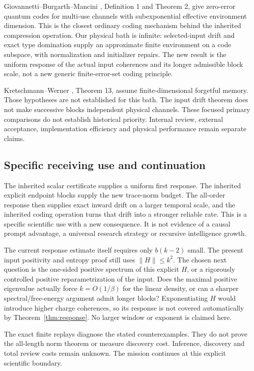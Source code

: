 \documentclass[11pt]{article}
\newcommand{\norm}[1]{\lVert #1\rVert}
\begin{document}
Giovannetti--Burgarth--Mancini \cite{GBM}, Definition 1 and Theorem 2,
give zero-error quantum codes for multi-use channels with subexponential
effective environment dimension. This is the closest ordinary coding
mechanism behind the inherited compression operation. Our physical bath
is infinite: selected-input drift and exact type domination supply an
approximate finite environment on a code subspace, with normalization
and initializer repairs. The new result is the uniform response of the
actual input coherences and its longer admissible block scale, not a
new generic finite-error-set coding principle.

Kretschmann--Werner \cite{KW}, Theorem 13, assume finite-dimensional
forgetful memory. Those hypotheses are not established for this bath.
The input drift theorem does not make successive blocks independent
physical channels. These focused primary comparisons do not establish
historical priority. Internal review, external acceptance, implementation
efficiency and physical performance remain separate claims.

\subsection{Specific receiving use and continuation}

The inherited scalar certificate supplies a uniform first response.
The inherited explicit endpoint blocks supply the new trace-norm budget.
The all-order response then supplies exact inward drift on a larger
temporal scale, and the inherited coding operation turns that drift into
a stronger reliable rate. This is a specific scientific use with a new
consequence. It is not evidence of a causal prompt advantage, a universal
research strategy or recursive intelligence growth.

The current response estimate itself requires only \(b(k-2)\) small.
The present input positivity and entropy proof still uses
\(\norm H\le k^2\). The chosen next question is the one-sided positive
spectrum of this explicit \(H\), or a rigorously controlled positive
reparametrization of the input. Does the maximal positive eigenvalue
actually force \(k=O(1/\beta)\) for the linear density, or can a sharper
spectral/free-energy argument admit longer blocks? Exponentiating \(H\)
would introduce higher charge coherences, so its response is not covered
automatically by Theorem~\ref{thm:response}. No larger window or exponent
is claimed here.

The exact finite replays diagnose the stated counterexamples. They do
not prove the all-length norm theorem or measure discovery cost.
Inference, discovery and total review costs remain unknown. The mission
continues at this explicit scientific boundary.
\end{document}
